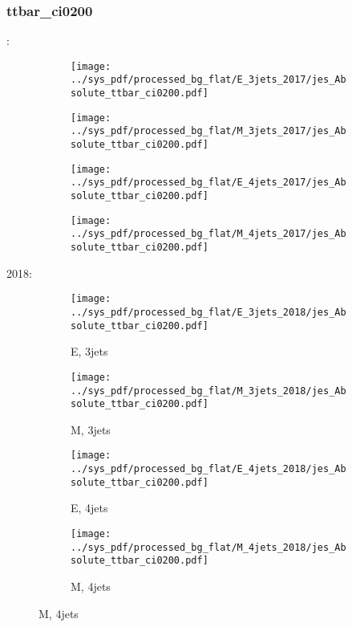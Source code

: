 \documentclass{beamer}
\begin{document}
\begin{frame}
\frametitle{ttbar_ci0200}
\fontsize{5}{1}:
\begin{figure}
\centering
\begin{subfigure}[b]{0.24\textwidth}
\texttt{[image: ../sys\_pdf/processed\_bg\_flat/E\_3jets\_2017/jes\_Absolute\_ttbar\_ci0200.pdf]}
\end{subfigure}
\begin{subfigure}[b]{0.24\textwidth}
\texttt{[image: ../sys\_pdf/processed\_bg\_flat/M\_3jets\_2017/jes\_Absolute\_ttbar\_ci0200.pdf]}
\end{subfigure}
\begin{subfigure}[b]{0.24\textwidth}
\texttt{[image: ../sys\_pdf/processed\_bg\_flat/E\_4jets\_2017/jes\_Absolute\_ttbar\_ci0200.pdf]}
\end{subfigure}
\begin{subfigure}[b]{0.24\textwidth}
\texttt{[image: ../sys\_pdf/processed\_bg\_flat/M\_4jets\_2017/jes\_Absolute\_ttbar\_ci0200.pdf]}
\end{subfigure}
\end{figure}
2018:
\begin{figure}
\centering
\begin{subfigure}[b]{0.24\textwidth}
\texttt{[image: ../sys\_pdf/processed\_bg\_flat/E\_3jets\_2018/jes\_Absolute\_ttbar\_ci0200.pdf]}
\captionsetup{font=tiny}
\caption{E, 3jets}
\end{subfigure}
\begin{subfigure}[b]{0.24\textwidth}
\texttt{[image: ../sys\_pdf/processed\_bg\_flat/M\_3jets\_2018/jes\_Absolute\_ttbar\_ci0200.pdf]}
\captionsetup{font=tiny}
\caption{M, 3jets}
\end{subfigure}
\begin{subfigure}[b]{0.24\textwidth}
\texttt{[image: ../sys\_pdf/processed\_bg\_flat/E\_4jets\_2018/jes\_Absolute\_ttbar\_ci0200.pdf]}
\captionsetup{font=tiny}
\caption{E, 4jets}
\end{subfigure}
\begin{subfigure}[b]{0.24\textwidth}
\texttt{[image: ../sys\_pdf/processed\_bg\_flat/M\_4jets\_2018/jes\_Absolute\_ttbar\_ci0200.pdf]}
\captionsetup{font=tiny}
\caption{M, 4jets}
\end{subfigure}
\end{figure}
\end{frame}
\end{document}
